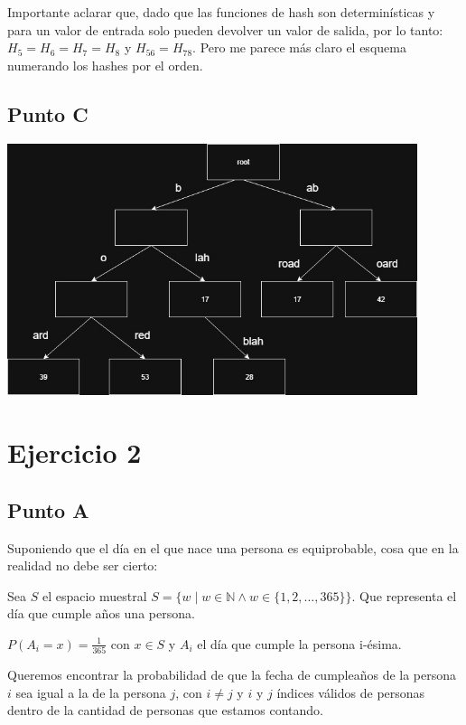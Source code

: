\documentclass[12pt]{article}
\begin{document}
Importante aclarar que, dado que las funciones de hash son determinísticas y para un valor de entrada solo pueden devolver un valor de salida, por lo tanto: $H_5 = H_6 = H_7 = H_8$ y $H_{56} = H_{78}$. Pero me parece más claro el esquema numerando los hashes por el orden.

\subsection*{Punto C}

\begin{center}
\includegraphics[width=0.9\textwidth]{patriciatrie.jpg}
\end{center}

\section*{Ejercicio 2}

\subsection*{Punto A}

Suponiendo que el día en el que nace una persona es equiprobable, cosa que en la realidad no debe ser cierto:

Sea $S$ el espacio muestral $S = \{w \mid w \in \mathbb{N} \land w \in \{1,2,\ldots,365\}\}$. Que representa el día que cumple años una persona.

$P(A_i = x) = \frac{1}{365}$ con $x \in S$ y $A_i$ el día que cumple la persona i-ésima.

Queremos encontrar la probabilidad de que la fecha de cumpleaños de la persona $i$ sea igual a la de la persona $j$, con $i \neq j$ y $i$ y $j$ índices válidos de personas dentro de la cantidad de personas que estamos contando.
\end{document}
